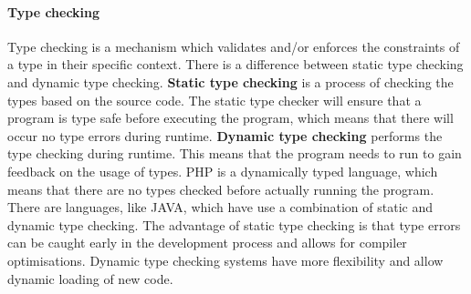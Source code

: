 \documentclass[../main.tex]{subfiles}
\begin{document}
    \paragraph{Type checking}
    Type checking is a mechanism which validates and/or enforces the constraints of a type in their specific context.
    There is a difference between static type checking and dynamic type checking.
    \textbf{Static type checking} is a process of checking the types based on the source code.
    The static type checker will ensure that a program is type safe before executing the program, which means that there will occur no type errors during runtime.
    \textbf{Dynamic type checking} performs the type checking during runtime.
    This means that the program needs to run to gain feedback on the usage of types.
    PHP is a dynamically typed language, which means that there are no types checked before actually running the program.
    There are languages, like JAVA, which have use a combination of static and dynamic type checking.
    The advantage of static type checking is that type errors can be caught early in the development process and allows for compiler optimisations.
    Dynamic type checking systems have more flexibility and allow dynamic loading of new code.
    
\end{document}

